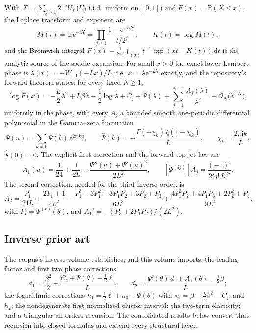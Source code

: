 \documentclass[11pt,oneside]{article}
\numberwithin{equation}{section}
\theoremstyle{definition}
\theoremstyle{remark}
\newcommand{\E}{\mathbb E}
\newcommand{\Prob}{\mathbb P}
\newcommand{\dd}{\,\mathrm d}
\newcommand{\e}{\mathrm e}
\newcommand{\ii}{\mathrm i}
\newcommand{\bigO}{\mathcal O}
\newcommand{\LambertW}{W}
\newcommand{\Psihat}{\widehat\Psi}
\newcommand{\Csharp}{C_{\sharp}}
\begin{document}
With $X=\sum_{j\ge1}2^{-j}U_j$ ($U_j$ i.i.d.\ uniform on $[0,1]$) and
$F(x)=\Prob(X\le x)$, the Laplace transform and exponent are
\begin{equation}
 M(t)=\E\,\e^{-tX}
 =\prod_{j\ge1}\frac{1-\e^{-t/2^{j}}}{t/2^{j}},
 \qquad
 K(t)=\log M(t),
 \label{eq:K-def}
\end{equation}
and the Bromwich integral
$F(x)=\frac1{2\pi\ii}\int_{(\sigma)}t^{-1}\exp(xt+K(t))\dd t$ is the
analytic source of the saddle expansion.  For small $x>0$ the exact
lower-Lambert phase is
$\lambda(x)=-\LambertW_{-1}(-Lx)/L$, i.e.\
$x=\lambda\e^{-L\lambda}$ exactly, and the repository's forward
theorem states: for every fixed $N\ge1$,
\begin{equation}
 \log F(x)=
 -\frac L2\lambda^{2}+L\beta\lambda-\frac12\log\lambda
 +\Csharp+\Psi(\lambda)
 +\sum_{j=1}^{N-1}\frac{A_j(\lambda)}{\lambda^{j}}
 +\bigO_N\bigl(\lambda^{-N}\bigr),
 \label{eq:forward-all-orders}
\end{equation}
uniformly in the phase, with every $A_j$ a bounded smooth one-periodic
differential polynomial in the Gamma--zeta fluctuation
\begin{equation}
 \Psi(u)=\sum_{k\ne0}\Psihat(k)\,\e^{2\pi\ii ku},
 \qquad
 \Psihat(k)=-\frac{\Gamma(-\chi_k)\,\zeta(1-\chi_k)}{L},
 \qquad
 \chi_k=\frac{2\pi\ii k}{L},
 \label{eq:Psi-Fourier}
\end{equation}
$\Psihat(0)=0$.  The explicit first correction and the forward
top-jet law are
\begin{equation}
 A_1(u)=\frac1{24}+\frac1{2L}
 -\frac{\Psi''(u)+\Psi'(u)^{2}}{2L^{2}},
 \qquad
 [\Psi^{(2j)}]A_j=\frac{(-1)^{j}}{2^{j}j!\,L^{2j}}.
 \label{eq:A1-and-topjet}
\end{equation}
The second correction, needed for the third inverse order, is
\begin{equation}
 A_2=\frac{P_1}{24L}+\frac{2P_1+1}{4L^{2}}
 -\frac{P_1^{3}+3P_1^{2}+3P_1P_2+3P_2+P_3}{6L^{3}}
 +\frac{4P_1^{2}P_2+4P_1P_3+2P_2^{2}+P_4}{8L^{4}},
 \label{eq:A2}
\end{equation}
with $P_r=\Psi^{(r)}(\theta)$, and
$A_1'=-(P_3+2P_1P_2)/(2L^{2})$.

\subsection{Inverse prior art}

The corpus's inverse volume establishes, and this volume imports: the
leading factor and first two phase corrections
\begin{equation}
 d_1=\frac{\beta^{2}}2
 +\frac{\Csharp+\Psi(\theta)-\tfrac12\ell}{L},
 \qquad
 d_2=\frac{\Psi'(\theta)\,d_1+A_1(\theta)-\tfrac12\beta}{L};
 \label{eq:d1-d2}
\end{equation}
the logarithmic corrections
$h_1=\tfrac12\ell+\kappa_0-\Psi(\theta)$ with
$\kappa_0=\beta-\tfrac L2\beta^{2}-\Csharp$, and $h_2$; the
nondegenerate first normalized cluster interval; the two-term
elasticity; and a triangular all-orders recursion.  The consolidated
results below convert that recursion into closed formulas and extend
every structural layer.
\end{document}
